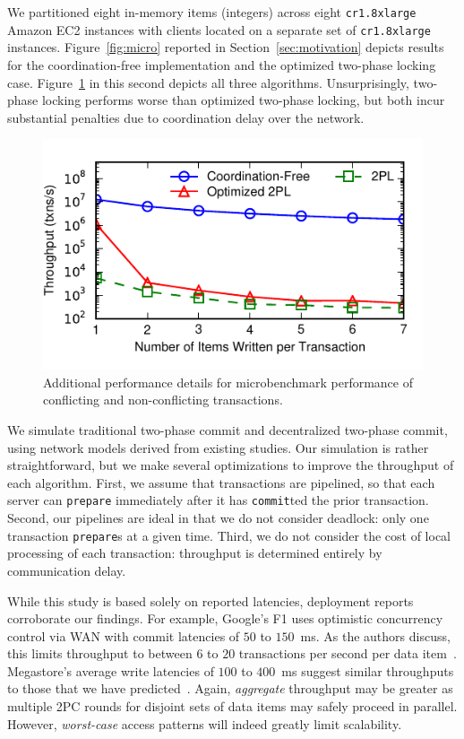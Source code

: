 We partitioned eight in-memory items (integers) across eight \texttt{cr1.8xlarge} Amazon EC2 instances with clients located on a separate set of \texttt{cr1.8xlarge} instances. Figure~\ref{fig:micro} reported in Section~\ref{sec:motivation} depicts results for the coordination-free implementation and the optimized two-phase locking case. Figure~\ref{fig:micro-all} in this second depicts all three algorithms. Unsurprisingly, two-phase locking performs worse than optimized two-phase locking, but both incur substantial penalties due to coordination delay over the network.

\begin{figure}
\includegraphics[width=\columnwidth]{figs/micro_thru_all.pdf}
\caption{Additional performance details for microbenchmark performance of conflicting and non-conflicting
  transactions.}
\label{fig:micro-all}
\end{figure}

 We simulate traditional two-phase commit and decentralized two-phase commit, using network models derived from existing studies. Our simulation is rather straightforward, but we make several optimizations to improve the throughput of each algorithm. First, we assume that transactions are pipelined, so that each server can \texttt{prepare} immediately after it has \texttt{commit}ted the prior transaction. Second, our pipelines are ideal in that we do not consider deadlock: only one transaction \texttt{prepare}s at a given time. Third, we do not consider the cost of local processing of each transaction: throughput is determined entirely by communication delay.

While this study is based solely on reported latencies, deployment
reports corroborate our findings. For example, Google's F1 uses
optimistic concurrency control via WAN with commit latencies of $50$
to $150$~ms. As the authors discuss, this limits throughput to between
$6$ to $20$ transactions per second per data
item~\cite{f1}. Megastore's average write latencies of $100$ to
$400$~ms suggest similar throughputs to those that we have
predicted~\cite{megastore}. Again, \textit{aggregate} throughput may
be greater as multiple 2PC rounds for disjoint sets of data items may
safely proceed in parallel. However, \textit{worst-case} access
patterns will indeed greatly limit scalability.

